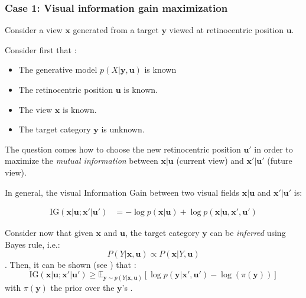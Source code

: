 \subsubsection{Case 1: Visual information gain maximization}\label{sec:case1}

Consider a view $\boldsymbol{x}$ generated from a target $\boldsymbol{y}$ viewed at retinocentric position $\boldsymbol{u}$. 

Consider first that :
\begin{itemize}
	\item The generative model  $p(X|\boldsymbol{y}, \boldsymbol{u})$ is known
	\item The retinocentric position  $\boldsymbol{u}$ is known.
	\item The view $\boldsymbol{x}$ is known.
	\item The target category  $\boldsymbol{y}$ is unknown.
\end{itemize} 



The question comes how to choose the new retinocentric position $\boldsymbol{u}'$ in order to maximize the \emph{mutual information} between $\boldsymbol{x}|\boldsymbol{u}$ (current view) and $\boldsymbol{x}'|\boldsymbol{u}'$ (future view).

In general, the visual Information Gain between two visual fields $\boldsymbol{x}|\boldsymbol{u}$  and $\boldsymbol{x}'|\boldsymbol{u}'$ is:

\begin{align*}
\text{IG}(\boldsymbol{x}|\boldsymbol{u}; \boldsymbol{x}'| \boldsymbol{u}') 
&= -\log p(\boldsymbol{x}|\boldsymbol{u}) 
+ \log p(\boldsymbol{x}|\boldsymbol{u}, \boldsymbol{x}', \boldsymbol{u}')
\end{align*}

Consider now that given  $\boldsymbol{x}$ and $\boldsymbol{u}$, the target category  $\boldsymbol{y}$ can be \emph{inferred} using Bayes rule, i.e.:
$$ P(Y|\boldsymbol{x}, \boldsymbol{u}) \propto  P(\boldsymbol{x}|Y, \boldsymbol{u}) $$. 
Then, it can be shown (see \cite{dauce2018}) that :
$$\text{IG}(\boldsymbol{x}|\boldsymbol{u}; \boldsymbol{x}'| \boldsymbol{u}') \geq \mathbb{E}_{\boldsymbol{y}\sim p(Y|\boldsymbol{x}, \boldsymbol{u})} \left[\log p(\boldsymbol{y}|\boldsymbol{x}', \boldsymbol{u}') - \log(\pi(\boldsymbol{y})) \right]$$
with  $\pi(\boldsymbol{y})$ the prior over the $\boldsymbol{y}$'s .

